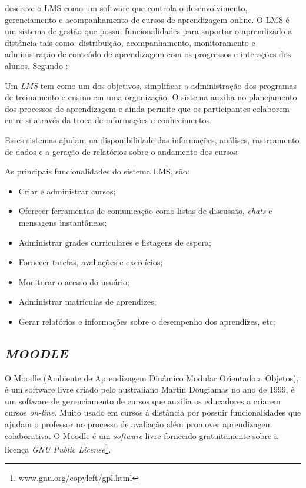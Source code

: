  descreve o \ac{LMS} como um software que controla o desenvolvimento, gerenciamento e acompanhamento de cursos de aprendizagem online. O \ac{LMS} é um sistema de gestão que possui funcionalidades para suportar o aprendizado a distância tais como: distribuição, acompanhamento, monitoramento e administração de conteúdo de aprendizagem com os progressos e interações dos alunos.
Segundo :
\begin{citacao}
  Um \textit{LMS} tem como um dos objetivos, simplificar a administração dos programas de treinamento e ensino em uma organização. O sistema auxilia no planejamento dos processos de aprendizagem e ainda permite que os participantes colaborem entre si através da troca de informações e conhecimentos.
\end{citacao}

Esses sistemas ajudam na disponibilidade das informações, análises, rastreamento de dados e a geração de relatórios sobre o andamento dos cursos.

As principais funcionalidades do sistema \ac{LMS}, são:
\begin{itemize}
  \item Criar e administrar cursos;
  \item Oferecer ferramentas de comunicação como listas de discussão, \textit{chats} e mensagens instantâneas;
  \item Administrar grades curriculares e listagens de espera;
  \item Fornecer tarefas, avaliações e exercícios;
  \item Monitorar o acesso do usuário;
  \item Administrar matrículas de aprendizes;
  \item Gerar relatórios e informações sobre o desempenho dos aprendizes, etc;
\end{itemize}

\subsection{\textit{MOODLE}}
O \ac{Moodle} (Ambiente de Aprendizagem Dinâmico Modular Orientado a Objetos), é um software livre criado pelo australiano Martin Dougiamas no ano de 1999, é um software de gerenciamento de cursos que auxilia os educadores a criarem cursos \textit{on-line}. Muito usado em cursos à distância por possuir funcionalidades que ajudam o professor no processo de avaliação além promover aprendizagem colaborativa. O \ac{Moodle} é um \textit{software} livre fornecido gratuitamente sobre a licença \textit{GNU Public License}\footnote{www.gnu.org/copyleft/gpl.html}. \cite{moodle}

